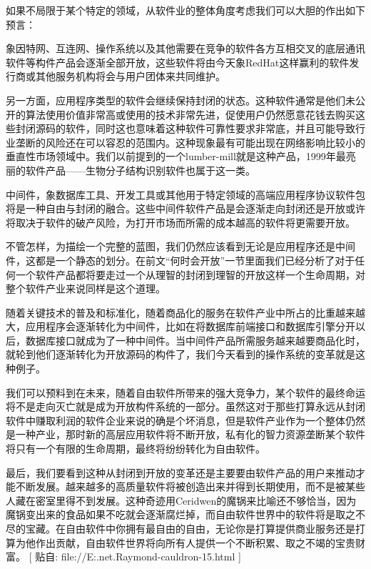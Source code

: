 \documentclass[a4paper,12pt,UTF8,twoside]{ctexbook}
\begin{document}
如果不局限于某个特定的领域，从软件业的整体角度考虑我们可以大胆的作出如下预言：


象因特网、互连网、操作系统以及其他需要在竞争的软件各方互相交叉的底层通讯软件等构件产品会逐渐全部开放，这些软件将由今天象RedHat这样赢利的软件发行商或其他服务机构将会与用户团体来共同维护。


另一方面，应用程序类型的软件会继续保持封闭的状态。这种软件通常是他们未公开的算法使用价值非常高或使用的技术非常先进，促使用户仍然愿意花钱去购买这些封闭源码的软件，同时这也意味着这种软件可靠性要求非常底，并且可能导致行业垄断的风险还在可以容忍的范围内。这种现象最有可能出现在网络影响比较小的垂直性市场领域中。我们以前提到的一个lumber-mill就是这种产品，1999年最亮丽的软件产品——生物分子结构识别软件也属于这一类。


中间件，象数据库工具、开发工具或其他用于特定领域的高端应用程序协议软件包将是一种自由与封闭的融合。这些中间件软件产品是会逐渐走向封闭还是开放或许将取决于软件的破产风险，为打开市场而所需的成本越高的软件将更需要开放。


不管怎样，为描绘一个完整的蓝图，我们仍然应该看到无论是应用程序还是中间件，这都是一个静态的划分。在前文“何时会开放”一节里面我们已经分析了对于任何一个软件产品都将要走过一个从理智的封闭到理智的开放这样一个生命周期，对整个软件产业来说同样是这个道理。


随着关键技术的普及和标准化，随着商品化的服务在软件产业中所占的比重越来越大，应用程序会逐渐转化为中间件，比如在将数据库前端接口和数据库引擎分开以后，数据库接口就成为了一种中间件。当中间件产品所需服务越来越要商品化时，就轮到他们逐渐转化为开放源码的构件了，我们今天看到的操作系统的变革就是这种例子。


我们可以预料到在未来，随着自由软件所带来的强大竞争力，某个软件的最终命运将不是走向灭亡就是成为开放构件系统的一部分。虽然这对于那些打算永远从封闭软件中赚取利润的软件企业来说的确是个坏消息，但是软件产业作为一个整体仍然是一种产业，那时新的高层应用软件将不断开放，私有化的智力资源垄断某个软件将只有一个有限的生命周期，最终将纷纷转化为自由软件。


最后，我们要看到这种从封闭到开放的变革还是主要要由软件产品的用户来推动才能不断发展。越来越多的高质量软件将被创造出来并得到长期使用，而不是被某些人藏在密室里得不到发展。这种奇迹用Ceridwen的魔锅来比喻还不够恰当，因为魔锅变出来的食品如果不吃就会逐渐腐烂掉，而自由软件世界中的软件将是取之不尽的宝藏。在自由软件中你拥有最自由的自由，无论你是打算提供商业服务还是打算为他作出贡献，自由软件世界将向所有人提供一个不断积累、取之不竭的宝贵财富。
[ 贴自: file://E:\joyfire\joyfire.net\bible\Eric.Raymond\magic-cauldron-15.html ]
\end{document}
